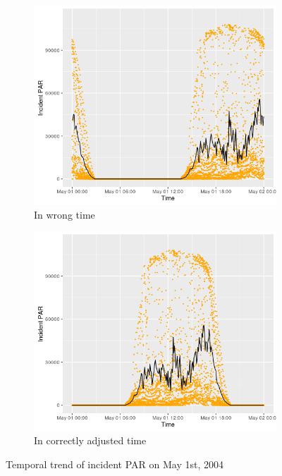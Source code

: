\documentclass[11pt]{article}
\begin{document}
\begin{figure}[here]
\centering
\begin{subfigure}{.5\textwidth}
  \centering
  \includegraphics[width=.85\linewidth]{../figures/wrongTimePAR.png}
  \caption{In wrong time}
  \label{fig:wrongTimePAR}
\end{subfigure}%
\begin{subfigure}{.5\textwidth}
  \centering
  \includegraphics[width=.85\linewidth]{../figures/correctTimePAR.png}
  \caption{In correctly adjusted time}
  \label{fig:correctTimePAR}
\end{subfigure}
\caption{Temporal trend of incident PAR on May 1st, 2004}
\end{figure}
\end{document}
